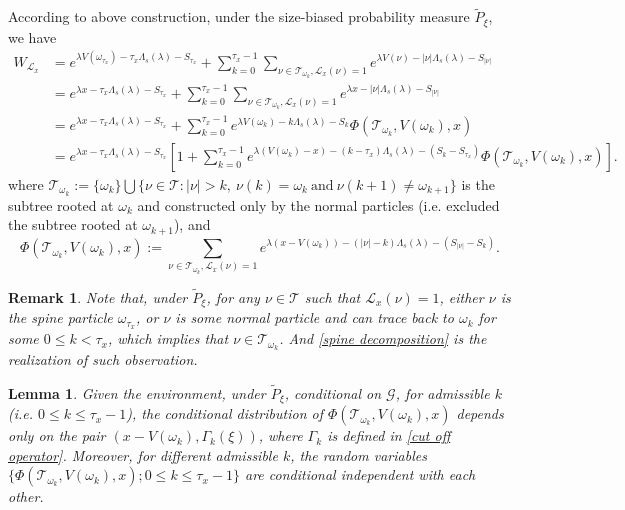 \documentclass[]{article}
\numberwithin{equation}{section}
\theoremstyle{thmstyleone}%
\theoremstyle{thmstyletwo}%
\newtheorem{remark}{Remark}%
\theoremstyle{thmstylethree}%
\theoremstyle{thmstylefour}%
\newtheorem{lemma}{Lemma}
\theoremstyle{thmstylefive}%
\theoremstyle{thmstylesix}%
\begin{document}
	According to above construction, under the size-biased probability measure $\tilde{P}_\xi$, we have
	\begin{align}
		W_{\mathcal{L}_x} &= e^{\lambda V(\omega_{\tau_x})-\tau_x\Lambda_s(\lambda)-S_{\tau_x} } +\sum_{k=0}^{\tau_x-1} \sum_{ \nu \in \mathcal{T}_{\omega_k}, \mathcal{L}_x(\nu)=1 } 
		e^{\lambda V(\nu)-|\nu|\Lambda_s(\lambda) -S_{|\nu|} } \nonumber
		\\
		&= e^{\lambda x-\tau_x\Lambda_s(\lambda)-S_{\tau_x} } +\sum_{k=0}^{\tau_x-1} \sum_{ \nu \in \mathcal{T}_{\omega_k}, \mathcal{L}_x(\nu)=1 } e^{\lambda x-|\nu|\Lambda_s(\lambda) -S_{|\nu|} }
		\nonumber\\
		&= e^{\lambda x-\tau_x\Lambda_s(\lambda)-S_{\tau_x} }
		+ \sum_{k=0}^{\tau_x-1} e^{\lambda V(\omega_k)- k\Lambda_s(\lambda)-S_{k}}
		\Phi(\mathcal{T}_{\omega_k},V(\omega_k),x)
		\nonumber\\
		&=
		e^{\lambda x -\tau_x\Lambda_s(\lambda)-S_{\tau_x}}
		\left[
		1+\sum_{k=0}^{\tau_x-1} e^{\lambda (V(\omega_k)-x)- (k-\tau_x)\Lambda_s(\lambda)-(S_{k}-S_{\tau_x})}
		\Phi(\mathcal{T}_{\omega_k},V(\omega_k),x)
		\right]
		. \label{spine decomposition}
	\end{align}
	where $\mathcal{T}_{\omega_k}:=\{\omega_k\}\bigcup\{\nu \in \mathcal{T}: |\nu|>k,~ \nu(k)=\omega_k ~ \text{and} ~ \nu(k+1)\neq \omega_{k+1} \} $ is the subtree rooted at $\omega_k$ and constructed only by the normal particles (i.e. excluded the subtree rooted at $\omega_{k+1}$), and
	\begin{equation}\label{37}
		\Phi(\mathcal{T}_{\omega_k},V(\omega_k),x) := \sum_{ \nu \in \mathcal{T}_{\omega_k}, \mathcal{L}_x(\nu)=1 } e^{\lambda \left(x-V(\omega_k)\right)-(|\nu|-k)\Lambda_s(\lambda) -(S_{|\nu|}-S_k) }.
	\end{equation}
	
	\begin{remark}
		Note that, under $\tilde{P}_\xi$, for any $\nu\in\mathcal{T}$ such that $\mathcal{L}_x(\nu)=1$, either $\nu$ is the spine particle $\omega_{\tau_x}$, or $\nu$ is some normal particle and can trace back to $\omega_k$ for some $ 0\leqslant k<\tau_x$, which implies that $\nu\in \mathcal{T}_{\omega_k}$. And \cref{spine decomposition} is the realization of such observation.
	\end{remark}
	
	\begin{lemma}\label{Lemma of spine decomposition}
		Given the environment, under $\tilde{P}_\xi$, conditional on $\mathcal{G}$, for admissible 
		$k$ (i.e. $0\leqslant k\leqslant\tau_x-1$), the conditional distribution of $\Phi(\mathcal{T}_{\omega_k},V(\omega_k),x)$ depends only on the pair $\left(x-V(\omega_k),\Gamma_k(\xi) \right)$, where $\Gamma_k$ is defined in \cref{cut off operator}. Moreover, for different admissible $k$, the random variables $\{\Phi(\mathcal{T}_{\omega_k},V(\omega_k),x);0\leqslant k\leqslant \tau_x-1\}$ are conditional independent with each other.
	\end{lemma}
	
\end{document}
